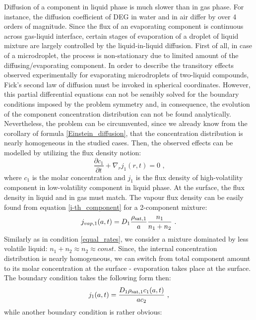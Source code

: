 \documentclass[twoside,twocolumn,9pt]{article}
\begin{document}
Diffusion of a component in liquid phase is much slower than in gas phase. For instance, the diffusion coefficient of DEG in water and in air differ by over 4 orders of magnitude. Since the flux of an evaporating component is continuous across gas-liquid interface, certain stages of evaporation of a droplet of liquid mixture are largely controlled by the liquid-in-liquid diffusion. First of all, in case of a microdroplet, the process is non-stationary due to limited amount of the diffusing/evaporating component. In order to describe the transitory effects observed experimentally for evaporating microdroplets of two-liquid compounds, Fick's second law of diffusion must be invoked in spherical coordinates. However, this partial differential equations can not be sensibly solved for the boundary conditions imposed by the problem symmetry and, in consequence, the evolution of the component concentration distribution can not be found analytically. Nevertheless, the problem can be circumvented, since we already know from the corollary of formula \ref{Einstein_diffusion}, that the concentration distribution is nearly homogeneous in the studied cases. Then, the observed effects can be modelled by utilizing the flux density notion:
\begin{equation}
\frac{\partial c_1}{\partial t} + \nabla _r j_1(r,t) = 0 \mbox{~,}
\label{II_Fick}
\end{equation}
where $c_1$ is the molar concentration and $j_1$ is the flux density of high-volatility component in low-volatility component in liquid phase.
At the surface, the flux density in liquid and in gas must match. The vapour flux density can be easily found from equation \ref{i-th_component} for a 2-component mixture:
\begin{equation}
j_{vap,1}(a,t) = D_{1} \frac{\rho_{{\rm sat},1}}{a} \frac{n_1}{n_1+n_2} \mbox{~.}
\end{equation}
Similarly as in condition \ref{equal_rates}, we consider a mixture dominated by less volatile liquid: $n_1 + n_2 \approx n_2 \approx const$. Since, the internal concentration distribution is nearly homogeneous, we can switch from total component amount to its molar concentration at the surface - evaporation takes place at the surface. The boundary condition takes the following form then:
\begin{equation}
j_1(a,t) = \frac{D_{1} \rho_{{\rm sat},1} c_1(a,t)}{a c_2} \mbox{~,}
\label{boundary_conditions_a}
\end{equation}
while another boundary condition is rather obvious:
\end{document}

